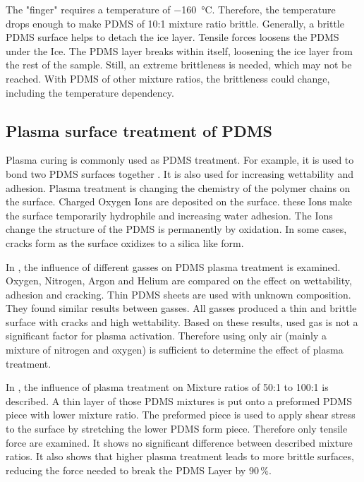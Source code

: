 The "finger" requires a temperature of \SI{-160}{\degreeCelsius}. Therefore, the temperature drops enough to make PDMS of 10:1 mixture ratio brittle. Generally, a brittle PDMS surface helps to detach the ice layer. Tensile forces loosens the PDMS under the Ice. The PDMS layer breaks within itself, loosening the ice layer from the rest of the sample. Still, an extreme brittleness is needed, which may not be reached. With PDMS of other mixture ratios, the brittleness could change, including the temperature dependency.

\subsection{Plasma surface treatment of PDMS}

Plasma curing is commonly used as PDMS treatment. For example, it is used to bond two PDMS surfaces together \cite{Borok.2021}. It is also used for increasing wettability and adhesion. Plasma treatment is changing the chemistry of the polymer chains on the surface. Charged Oxygen Ions are deposited on the surface. these Ions make the surface temporarily hydrophile and increasing water adhesion. The Ions change the structure of the PDMS is permanently by oxidation. In some cases, cracks form as the surface oxidizes to a silica like form.

In \cite{Owen.1994}, the influence of different gasses on PDMS plasma treatment is examined. Oxygen, Nitrogen, Argon and Helium are compared on the effect on wettability, adhesion and cracking. Thin PDMS sheets are used with unknown composition. They found similar results between gasses. All gasses produced a thin and brittle surface with cracks and high wettability. Based on these results, used gas is not a significant factor for plasma activation. Therefore using only air (mainly a mixture of nitrogen and oxygen) is sufficient to determine the effect of plasma treatment.


In \cite{Ohishi.2017}, the influence of plasma treatment on Mixture ratios of 50:1 to 100:1 is described. A thin layer of those PDMS mixtures is put onto a preformed PDMS piece with lower mixture ratio. The preformed piece is used to apply shear stress to the surface by stretching the lower PDMS form piece. Therefore only tensile force are examined. It shows no significant difference between described mixture ratios. It also shows that higher plasma treatment leads to more brittle surfaces, reducing the force needed to break the PDMS Layer by $90\,\%$.

